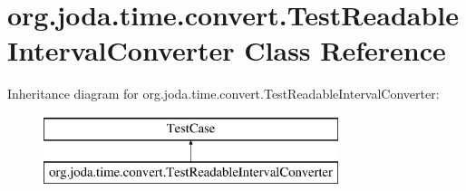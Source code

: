 \hypertarget{classorg_1_1joda_1_1time_1_1convert_1_1_test_readable_interval_converter}{\section{org.\-joda.\-time.\-convert.\-Test\-Readable\-Interval\-Converter Class Reference}
\label{classorg_1_1joda_1_1time_1_1convert_1_1_test_readable_interval_converter}
}
Inheritance diagram for org.\-joda.\-time.\-convert.\-Test\-Readable\-Interval\-Converter\-:\begin{figure}[H]
\begin{center}
\leavevmode
\includegraphics[height=2.000000cm]{classorg_1_1joda_1_1time_1_1convert_1_1_test_readable_interval_converter}
\end{center}
\end{figure}

